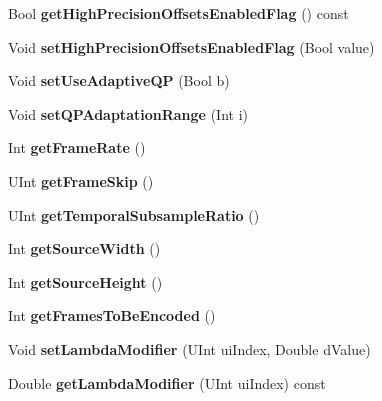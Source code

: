 \begin{DoxyCompactItemize}
Bool {\bfseries get\+High\+Precision\+Offsets\+Enabled\+Flag} () const
\item 
\mbox{\label{class_t_enc_cfg_ac1827911147b4db2a2301799db107acb}} 
Void {\bfseries set\+High\+Precision\+Offsets\+Enabled\+Flag} (Bool value)
\item 
\mbox{\label{class_t_enc_cfg_ad4572c98604df526d8f61b5697beb2fb}} 
Void {\bfseries set\+Use\+Adaptive\+QP} (Bool b)
\item 
\mbox{\label{class_t_enc_cfg_aec7d626a1fd01b2abef12a2236ed8956}} 
Void {\bfseries set\+Q\+P\+Adaptation\+Range} (Int i)
\item 
\mbox{\label{class_t_enc_cfg_a7663350a5da1eced980d3005be414640}} 
Int {\bfseries get\+Frame\+Rate} ()
\item 
\mbox{\label{class_t_enc_cfg_a3bb649c15d90c621b2a93001338c3330}} 
U\+Int {\bfseries get\+Frame\+Skip} ()
\item 
\mbox{\label{class_t_enc_cfg_af2bca0fbd25070765a17aa7ef8a83372}} 
U\+Int {\bfseries get\+Temporal\+Subsample\+Ratio} ()
\item 
\mbox{\label{class_t_enc_cfg_a0c330e5cbec0a92a5e58fb9821fc87fd}} 
Int {\bfseries get\+Source\+Width} ()
\item 
\mbox{\label{class_t_enc_cfg_a67e1938ce41005ec45acbc66ffcaba2c}} 
Int {\bfseries get\+Source\+Height} ()
\item 
\mbox{\label{class_t_enc_cfg_a1a1feb1fc2f682b575c11d1bfeb91d4d}} 
Int {\bfseries get\+Frames\+To\+Be\+Encoded} ()
\item 
\mbox{\label{class_t_enc_cfg_a6755eb2adb8527410ce59a6b97733112}} 
Void {\bfseries set\+Lambda\+Modifier} (U\+Int ui\+Index, Double d\+Value)
\item 
\mbox{\label{class_t_enc_cfg_adbc5c2208302e131db30f1173102ad65}} 
Double {\bfseries get\+Lambda\+Modifier} (U\+Int ui\+Index) const
\item 

\end{DoxyCompactItemize}
